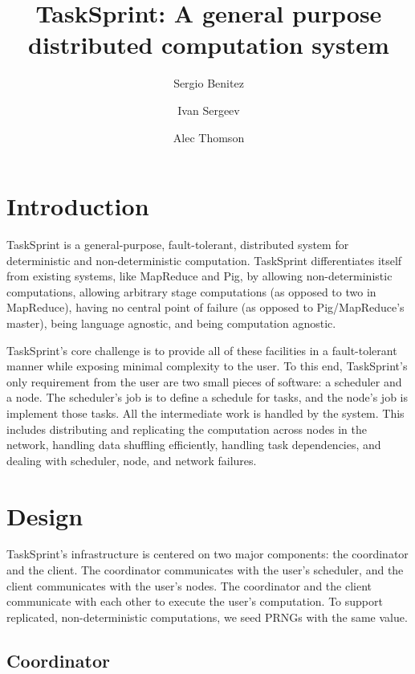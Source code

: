 \documentclass [11pt, twocolumn] {article}
\begin{document}
 

\title { TaskSprint: A general purpose distributed computation system }
\author{ Sergio Benitez \and  Ivan Sergeev \and Alec Thomson  }
\date {}

\maketitle

\section {Introduction} 
TaskSprint is a general-purpose, fault-tolerant, distributed system for deterministic and non-deterministic computation. TaskSprint differentiates itself from existing systems, like MapReduce and Pig, by allowing non-deterministic computations, allowing arbitrary stage computations (as opposed to two in MapReduce), having no central point of failure (as opposed to Pig/MapReduce's master), being language agnostic, and being computation agnostic.

TaskSprint's core challenge is to provide all of these facilities in a fault-tolerant manner while exposing minimal complexity to the user. To this end, TaskSprint's only requirement from the user are two small pieces of software: a scheduler and a node. The scheduler's job is to define a schedule for tasks, and the node's job is implement those tasks. All the intermediate work is handled by the system. This includes distributing and replicating the computation across nodes in the network, handling data shuffling efficiently, handling task dependencies, and dealing with scheduler, node, and network failures.

\section {Design}

TaskSprint's infrastructure is centered on two major components: the coordinator and the client. The coordinator communicates with the user's scheduler, and the client communicates with the user's nodes. The coordinator and the client communicate with each other to execute the user's computation. To support replicated, non-deterministic computations, we seed PRNGs with the same value.

\subsection {Coordinator} 
\end{document}
